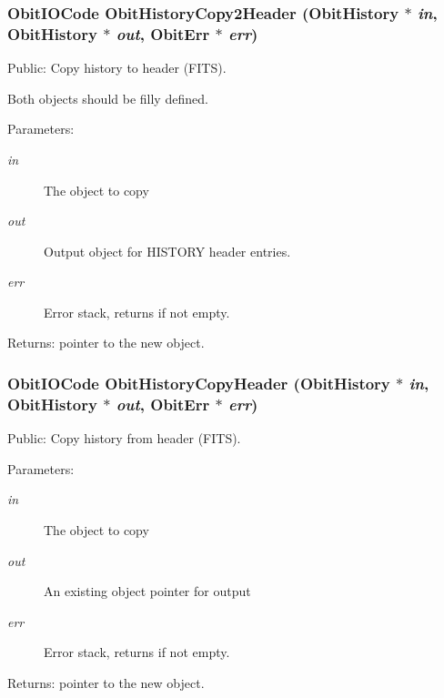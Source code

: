 \subsubsection{\setlength{\rightskip}{0pt plus 5cm}Obit\-IOCode Obit\-History\-Copy2Header ({\bf Obit\-History} $\ast$ {\em in}, {\bf Obit\-History} $\ast$ {\em out}, {\bf Obit\-Err} $\ast$ {\em err})}\label{ObitHistory_8h_a15}


Public: Copy history to header (FITS). 

Both objects should be filly defined. \begin{Desc}
\item[Parameters:]
\begin{description}
\item[{\em in}]The object to copy \item[{\em out}]Output object for HISTORY header entries. \item[{\em err}]Error stack, returns if not empty. \end{description}
\end{Desc}
\begin{Desc}
\item[Returns:]pointer to the new object. \end{Desc}
\subsubsection{\setlength{\rightskip}{0pt plus 5cm}Obit\-IOCode Obit\-History\-Copy\-Header ({\bf Obit\-History} $\ast$ {\em in}, {\bf Obit\-History} $\ast$ {\em out}, {\bf Obit\-Err} $\ast$ {\em err})}\label{ObitHistory_8h_a14}


Public: Copy history from header (FITS). 

\begin{Desc}
\item[Parameters:]
\begin{description}
\item[{\em in}]The object to copy \item[{\em out}]An existing object pointer for output \item[{\em err}]Error stack, returns if not empty. \end{description}
\end{Desc}
\begin{Desc}
\item[Returns:]pointer to the new object. \end{Desc}
